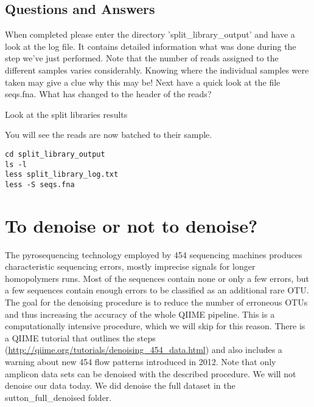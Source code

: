 \subsection{Questions and Answers}

\begin{questions}
When completed please enter the directory 'split\_library\_output' and have a look at the log file. It contains detailed information what was done during the step we've just performed. Note that the number of reads assigned to the different samples varies considerably. Knowing where the individual samples were taken may give a clue why this may be! Next have a quick look at the file seqs.fna. What has changed to the header of the reads?

\begin{answer}
Look at the split libraries results
\end{answer}

\end{questions}

\begin{steps}

You will see the reads are now batched to their sample.
\begin{lstlisting}
cd split_library_output
ls -l
less split_library_log.txt
less -S seqs.fna

\end{lstlisting}

\end{steps}

\section{To denoise or not to denoise?}

The pyrosequencing technology employed by 454 sequencing machines produces characteristic sequencing errors, mostly imprecise signals for longer homopolymers runs. Most of the sequences contain none or only a few errors, but a few sequences contain enough errors to be classified as an additional rare OTU. The goal for the denoising procedure is to reduce the number of erroneous OTUs and thus increasing the accuracy of the whole QIIME pipeline. This is a computationally intensive procedure, which we will skip for this reason. There is a QIIME tutorial that outlines the steps (\url{http://qiime.org/tutorials/denoising_454_data.html}) and also includes a warning about new 454 flow patterns introduced in 2012. Note that only amplicon data sets can be denoised with the described procedure. We will not denoise our data today. We did denoise the full dataset in the sutton\_full\_denoised folder.


